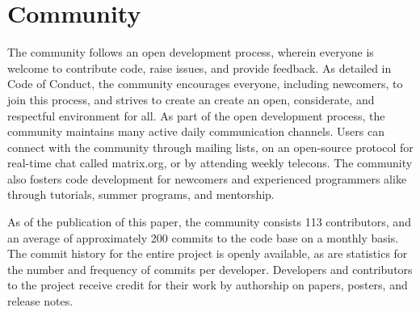 \section{Community}
\label{sec:community}

The \sunpy community follows an open development process, wherein everyone is welcome to contribute code, raise issues, and provide feedback.
As detailed in \sunpy Code of Conduct, the community encourages everyone, including newcomers, to join this process, and strives to create an create an open, considerate, and respectful environment for all.
As part of the open development process, the \sunpy community maintains many active daily communication channels.
Users can connect with the community through mailing lists, on an open-source protocol for real-time chat called matrix.org, or by attending weekly telecons.
The \sunpy community also fosters code development for newcomers and experienced programmers alike through tutorials, summer programs, and mentorship.

As of the publication of this paper, the \sunpy community consists 113 contributors, and an average of approximately 200 commits to the code base on a monthly basis.
The commit history for the entire project is openly available, as are statistics for the number and frequency of commits per developer.
Developers and contributors to the \sunpy project receive credit for their work by authorship on papers, posters, and release notes.
